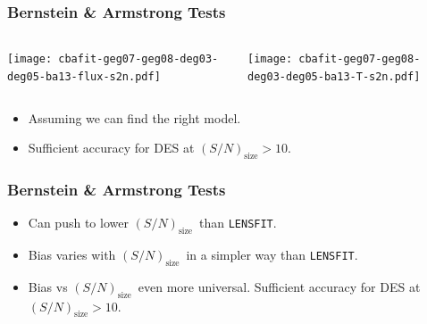 \documentclass{beamer}
\newcommand{\snT}{$(S/N)_{\textrm{size}}$}
\newcommand{\lensfit}{\texttt{LENSFIT}}
\begin{document}
\frame
{
    \frametitle{Bernstein \& Armstrong Tests}

    \begin{columns}
        
        \begin{column}{0.5\textwidth}
            \texttt{[image: cbafit-geg07-geg08-deg03-deg05-ba13-flux-s2n.pdf]}
        \end{column}

        \begin{column}{0.5\textwidth}
            \texttt{[image: cbafit-geg07-geg08-deg03-deg05-ba13-T-s2n.pdf]}
        \end{column}
    \end{columns}

    \begin{itemize}
        \item Assuming we can find the right model.
        \item Sufficient accuracy for DES at \snT$ > 10$.
    \end{itemize}
}


\frame
{
    
    \frametitle{Bernstein \& Armstrong Tests}

    \begin{itemize}
        \item Can push to lower \snT\ than \lensfit.

        \item Bias varies with \snT\ in a simpler way than \lensfit.
        \item Bias vs \snT\ even more universal. Sufficient accuracy for DES at \snT$ > 10$.

       

    \end{itemize}
}
\end{document}
